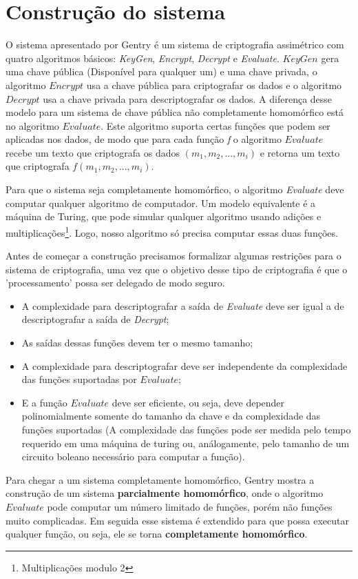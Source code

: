 \chapter{Construção do sistema}
\label{construcao}
O sistema apresentado por Gentry é um sistema de criptografia assimétrico com quatro algoritmos básicos: \textit{KeyGen}, \textit{Encrypt}, \textit{Decrypt} e \textit{Evaluate}. $KeyGen$ gera uma chave pública (Disponível para qualquer um) e uma chave privada, o algoritmo $Encrypt$ usa a chave pública para criptografar os dados e o algoritmo $Decrypt$ usa a chave privada para descriptografar os dados. A diferença desse modelo para um sistema de chave pública não completamente homomórfico está no algoritmo $Evaluate$. Este algoritmo suporta certas funções que podem ser aplicadas nos dados, de modo que para cada função \textit{f} o algoritmo $Evaluate$ recebe um texto que criptografa os dados $(m_1, m_2, ..., m_i)$ e retorna um texto que criptografa $f(m_1, m_2, ..., m_i)$.

Para que o sistema seja completamente homomórfico, o algoritmo \textit{Evaluate} deve computar qualquer algoritmo de computador. Um modelo equivalente é a máquina de Turing, que pode simular qualquer algoritmo usando adições e multiplicações\footnote{Multiplicações modulo 2}. Logo, nosso algoritmo só precisa computar essas duas funções.

Antes de começar a construção precisamos formalizar algumas restrições para o sistema de criptografia, uma vez que o objetivo desse tipo de criptografia é que o 'processamento' possa ser delegado de modo seguro.
\begin{itemize}
	\item A complexidade para descriptografar a saída de \textit{Evaluate} deve ser igual a de descriptografar a saída de \textit{Decrypt};
	\item As saídas dessas funções devem ter o mesmo tamanho;
	\item A complexidade para descriptografar deve ser independente da complexidade das funções suportadas por $Evaluate$;
	\item E a função $Evaluate$ deve ser eficiente, ou seja, deve depender polinomialmente somente do tamanho da chave e da complexidade das funções suportadas (A complexidade das funções pode ser medida pelo tempo requerido em uma máquina de turing ou, análogamente, pelo tamanho de um circuito boleano necessário para computar a função).
\end{itemize}

Para chegar a um sistema completamente homomórfico, Gentry mostra a construção de um sistema \textbf{parcialmente homomórfico}, onde o algoritmo $Evaluate$ pode computar um número limitado de funções, porém não funções muito complicadas. Em seguida esse sistema é extendido para que possa executar qualquer função, ou seja, ele se torna \textbf{completamente homomórfico}.

